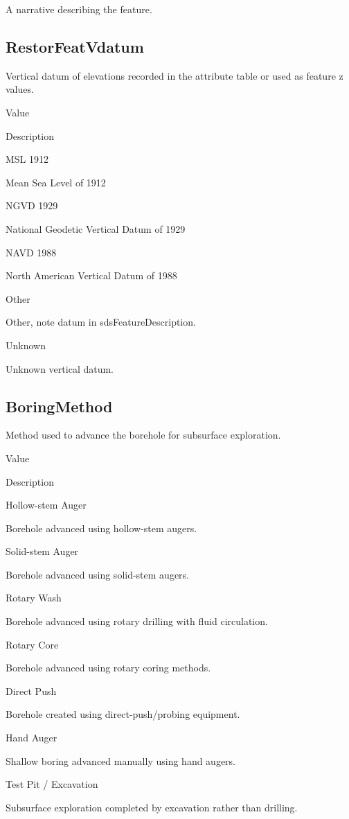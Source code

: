 \documentclass[
  letterpaper,
  DIV=11,
  numbers=noendperiod]{scrreprt}
\begin{document}
A narrative describing the feature.

\subsection{RestorFeatVdatum}\label{restorfeatvdatum-18}

Vertical datum of elevations recorded in the attribute table or used as
feature z values.

Value

Description

MSL 1912

Mean Sea Level of 1912

NGVD 1929

National Geodetic Vertical Datum of 1929

NAVD 1988

North American Vertical Datum of 1988

Other

Other, note datum in sdsFeatureDescription.

Unknown

Unknown vertical datum.

\subsection{BoringMethod}\label{boringmethod}

Method used to advance the borehole for subsurface exploration.

Value

Description

Hollow-stem Auger

Borehole advanced using hollow-stem augers.

Solid-stem Auger

Borehole advanced using solid-stem augers.

Rotary Wash

Borehole advanced using rotary drilling with fluid circulation.

Rotary Core

Borehole advanced using rotary coring methods.

Direct Push

Borehole created using direct-push/probing equipment.

Hand Auger

Shallow boring advanced manually using hand augers.

Test Pit / Excavation

Subsurface exploration completed by excavation rather than drilling.
\end{document}
